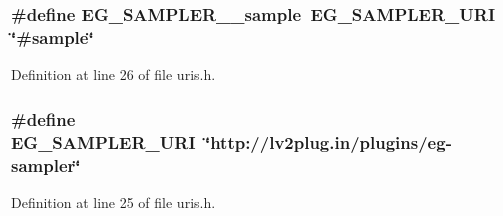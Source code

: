 \subsubsection[{\texorpdfstring{E\+G\+\_\+\+S\+A\+M\+P\+L\+E\+R\+\_\+\+\_\+sample}{EG_SAMPLER__sample}}]{\setlength{\rightskip}{0pt plus 5cm}\#define E\+G\+\_\+\+S\+A\+M\+P\+L\+E\+R\+\_\+\+\_\+sample~{\bf E\+G\+\_\+\+S\+A\+M\+P\+L\+E\+R\+\_\+\+U\+RI} \char`\"{}\#sample\char`\"{}}\hypertarget{eg-sampler_8lv2_2uris_8h_aca29f23b2c8ead85288eb03aa409d6bd}{}\label{eg-sampler_8lv2_2uris_8h_aca29f23b2c8ead85288eb03aa409d6bd}


Definition at line 26 of file uris.\+h.

\subsubsection[{\texorpdfstring{E\+G\+\_\+\+S\+A\+M\+P\+L\+E\+R\+\_\+\+U\+RI}{EG_SAMPLER_URI}}]{\setlength{\rightskip}{0pt plus 5cm}\#define E\+G\+\_\+\+S\+A\+M\+P\+L\+E\+R\+\_\+\+U\+RI~\char`\"{}http\+://{\bf lv2plug.\+in}/plugins/eg-\/sampler\char`\"{}}\hypertarget{eg-sampler_8lv2_2uris_8h_a966f6b9a1ca832fd8e81525bd2be525e}{}\label{eg-sampler_8lv2_2uris_8h_a966f6b9a1ca832fd8e81525bd2be525e}


Definition at line 25 of file uris.\+h.

